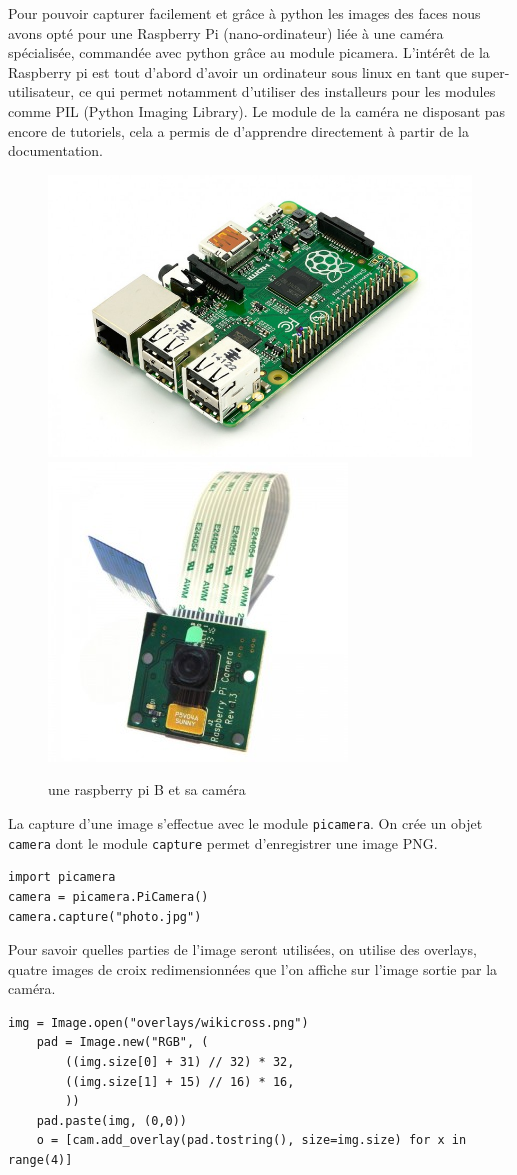 \documentclass[11pt,a4paper]{article}
\begin{document}
    Pour pouvoir capturer facilement et grâce à python les images des faces nous avons opté pour une Raspberry
Pi (nano-ordinateur) liée à une caméra spécialisée, commandée avec python grâce au module picamera.
    L'intérêt de la Raspberry pi est tout d'abord d'avoir un ordinateur sous linux en tant que super-utilisateur,
ce qui permet notamment d'utiliser des installeurs pour les modules comme PIL (Python Imaging Library).
    Le module de la caméra ne disposant pas encore de tutoriels, cela a permis de d'apprendre directement à partir de la documentation.
\begin{figure}[h]
	\centering
	\includegraphics[scale=0.2]{Raspberry_Pi_B-_u}
	\includegraphics[scale=0.3]{raspberry-pi-camera}
	\caption{une raspberry pi B et sa caméra}
\end{figure}
La capture d'une image s'effectue avec le module \texttt{picamera}. On crée un objet \texttt{camera} dont le module \texttt{capture} permet d'enregistrer
une image PNG.
\begin{lstlisting}
import picamera
camera = picamera.PiCamera()
camera.capture("photo.jpg")
\end{lstlisting}
Pour savoir quelles parties de l'image seront utilisées, on utilise des overlays, quatre images de croix redimensionnées que l'on affiche sur l'image sortie par la caméra.
\begin{lstlisting}
img = Image.open("overlays/wikicross.png")
    pad = Image.new("RGB", (
        ((img.size[0] + 31) // 32) * 32,
        ((img.size[1] + 15) // 16) * 16,
        ))
    pad.paste(img, (0,0))
    o = [cam.add_overlay(pad.tostring(), size=img.size) for x in range(4)]
\end{lstlisting}
\end{document}
